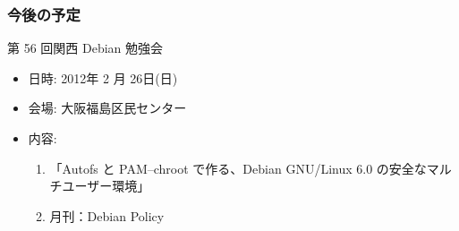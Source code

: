 \documentclass[cjk,dvipdfmx,10pt,%
hyperref={bookmarks=true,bookmarksnumbered=true,bookmarksopen=false,%
colorlinks=false,%
pdftitle={第 55 回 関西 Debian 勉強会＠Debian 温泉合宿},%
pdfauthor={倉敷・のがた・佐々木・かわだ},%
pdfsubject={資料},%
}]{beamer}
\begin{document}




\begin{frame}[fragile]
\frametitle{今後の予定}

\begin{block}{第 56 回関西 Debian 勉強会}
  \begin{itemize}
  \item 日時: 2012年 2 月 26日(日)
  \item 会場: 大阪福島区民センター
  \item 内容:
    \begin{enumerate}
    \item 「Autofs と PAM--chroot で作る、Debian GNU/Linux 6.0 の安全なマルチユーザー環境」
    \item 月刊：Debian Policy
    \end{enumerate}
  \end{itemize}
\end{block}
\end{frame}

\takahashi[50]{  }
\end{document}
